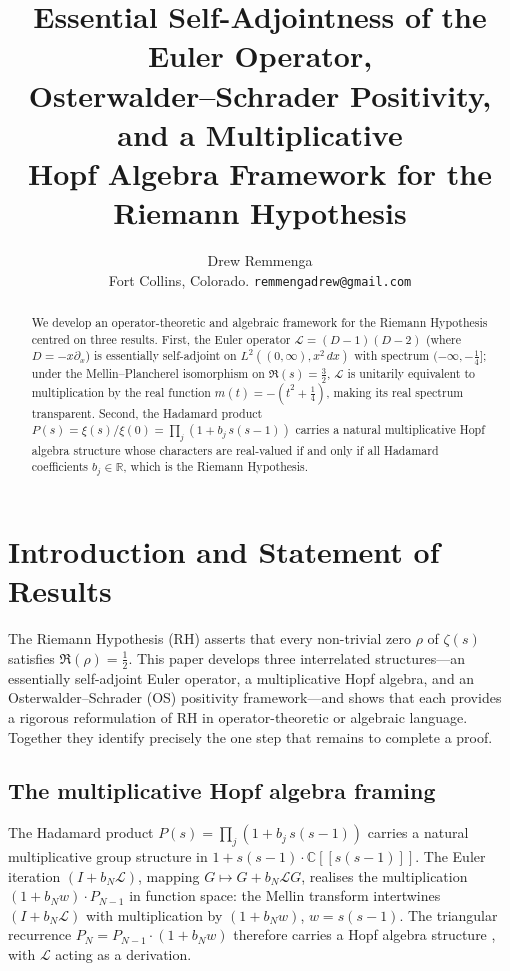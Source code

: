 \documentclass[12pt]{article}
\title{Essential Self-Adjointness of the Euler Operator,\\
Osterwalder--Schrader Positivity, and a Multiplicative\\
Hopf Algebra Framework for the Riemann Hypothesis}
\author{Drew Remmenga\\
  \small Fort Collins, Colorado.
  \texttt{remmengadrew@gmail.com}}
\date{}
\theoremstyle{plain}
\theoremstyle{definition}
\newcommand{\C}{\mathbb{C}}
\newcommand{\R}{\mathbb{R}}
\begin{document}
\maketitle

\begin{abstract}
We develop an operator-theoretic and algebraic framework for the Riemann
Hypothesis centred on three results.
First, the Euler operator $\mathcal{L}=(D{-}1)(D{-}2)$ (where
$D=-x\partial_x$) is essentially self-adjoint on
$L^2((0,\infty),x^2\,dx)$ with spectrum $(-\infty,-\tfrac14]$;
under the Mellin--Plancherel isomorphism on $\Re(s)=\tfrac32$,
$\mathcal{L}$ is unitarily equivalent to multiplication by the real
function $m(t)=-(t^2+\tfrac14)$, making its real spectrum transparent.
Second, the Hadamard product $P(s)=\xi(s)/\xi(0)=\prod_j(1+b_j\,s(s-1))$
carries a natural multiplicative Hopf algebra structure whose characters
are real-valued if and only if all Hadamard coefficients $b_j\in\R$,
which is the Riemann Hypothesis. 
\end{abstract}

\section{Introduction and Statement of Results}
\label{sec:intro}

The Riemann Hypothesis (RH) asserts that every non-trivial zero $\rho$ of
$\zeta(s)$ satisfies $\Re(\rho)=\tfrac12$.
This paper develops three interrelated structures---an essentially
self-adjoint Euler operator, a multiplicative Hopf algebra, and an
Osterwalder--Schrader (OS) positivity framework---and shows that each
provides a rigorous reformulation of RH in operator-theoretic or algebraic
language.  Together they identify precisely the one step that remains to
complete a proof.

\subsection{The multiplicative Hopf algebra framing}

The Hadamard product $P(s)=\prod_j(1+b_j\,s(s-1))$ carries a natural
multiplicative group structure in $1+s(s-1)\cdot\C[[s(s-1)]]$.
The Euler iteration $(I+b_N\mathcal{L})$, mapping $G\mapsto G+b_N\mathcal{L}G$,
realises the multiplication $(1+b_N w)\cdot P_{N-1}$ in function space:
the Mellin transform intertwines $(I+b_N\mathcal{L})$ with multiplication by
$(1+b_N w)$, $w=s(s-1)$.  The triangular recurrence $P_N=P_{N-1}\cdot(1+b_N w)$
therefore carries a Hopf algebra structure \cite{Drinfeld1985}, with
$\mathcal{L}$ acting as a derivation.
\end{document}
